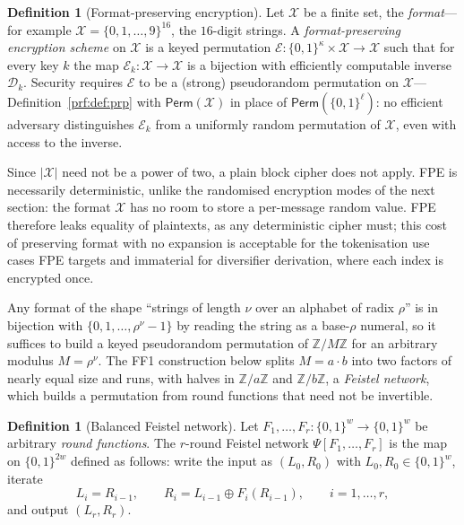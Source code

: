 \documentclass[11pt,a4paper]{article}
\theoremstyle{definition}
\newtheorem{definition}[theorem]{Definition}
\theoremstyle{remark}
\newcommand{\Z}{\ensuremath{\mathbb{Z}}}
\providecommand{\abs}[1]{\lvert #1 \rvert}
\begin{document}
\begin{definition}[Format-preserving encryption]\label{prf:def:fpe}
Let \(\mathcal{X}\) be a finite set, the \emph{format}---for example
\(\mathcal{X} = \{0, 1, \dots, 9\}^{16}\), the \(16\)-digit strings. A
\emph{format-preserving encryption scheme} on \(\mathcal{X}\) is a
keyed permutation
\(\mathcal{E} \colon \{0,1\}^{\kappa} \times \mathcal{X} \to
\mathcal{X}\) such that for every key \(k\) the map
\(\mathcal{E}_{k} \colon \mathcal{X} \to \mathcal{X}\) is a bijection
with efficiently computable inverse \(\mathcal{D}_{k}\). Security
requires \(\mathcal{E}\) to be a (strong) pseudorandom permutation on
\(\mathcal{X}\)---Definition~\ref{prf:def:prp} with
\(\mathsf{Perm}(\mathcal{X})\) in place of
\(\mathsf{Perm}(\{0,1\}^{\ell})\): no efficient adversary
distinguishes \(\mathcal{E}_{k}\) from a uniformly random permutation
of \(\mathcal{X}\), even with access to the inverse.
\end{definition}

Since \(\abs{\mathcal{X}}\) need not be a power of two, a plain block
cipher does not apply. FPE is necessarily deterministic, unlike the
randomised encryption modes of the next section: the format
\(\mathcal{X}\) has no room to store a per-message random value. FPE
therefore leaks equality of plaintexts, as any deterministic cipher
must; this cost of preserving format with no expansion is acceptable
for the tokenisation use cases FPE targets and immaterial for
diversifier derivation, where each index is encrypted once.

Any format of the shape ``strings of length \(\nu\) over an alphabet of
radix \(\rho\)'' is in bijection with
\(\{0, 1, \dots, \rho^{\nu} - 1\}\) by reading the string as a
base-\(\rho\) numeral, so it suffices to build a keyed pseudorandom
permutation of \(\Z/M\Z\) for an arbitrary modulus
\(M = \rho^{\nu}\). The FF1 construction below splits
\(M = a \cdot b\) into two factors of nearly equal size and runs, with
halves in \(\Z/a\Z\) and \(\Z/b\Z\), a \emph{Feistel network}, which
builds a permutation from round functions that need not be invertible.

\begin{definition}[Balanced Feistel network]\label{prf:def:feistel}
Let \(F_{1}, \dots, F_{r} \colon \{0,1\}^{w} \to \{0,1\}^{w}\) be
arbitrary \emph{round functions}. The \(r\)-round Feistel network
\(\Psi[F_{1}, \dots, F_{r}]\) is the map on \(\{0,1\}^{2w}\) defined
as follows: write the input as \((L_{0}, R_{0})\) with
\(L_{0}, R_{0} \in \{0,1\}^{w}\), iterate
\[
L_{i} = R_{i-1},
\qquad
R_{i} = L_{i-1} \oplus F_{i}(R_{i-1}),
\qquad i = 1, \dots, r,
\]
and output \((L_{r}, R_{r})\).
\end{definition}
\end{document}
